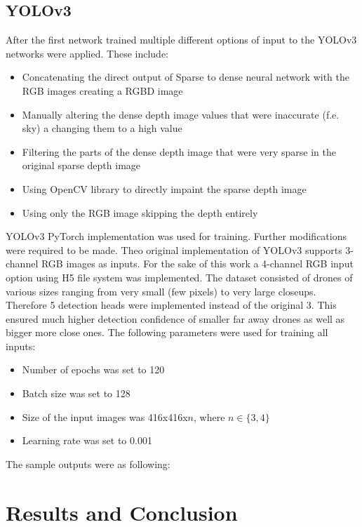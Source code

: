 \documentclass[twoside]{ctuthesis}
\theoremstyle{plain}
\theoremstyle{definition}
\theoremstyle{note}
\begin{document}
\section{YOLOv3}
After the first network trained multiple different options of input to the YOLOv3 networks were applied. These include:
\begin{itemize}
	\item Concatenating the direct output of Sparse to dense neural network with the RGB images creating a RGBD image
	\item Manually altering the dense depth image values that were inaccurate (f.e. sky) a changing them to a high value
	\item Filtering the parts of the dense depth image that were very sparse in the original sparse depth image
	\item Using OpenCV library to directly impaint the sparse depth image
	\item Using only the RGB image skipping the depth entirely
\end{itemize}
YOLOv3 PyTorch implementation was used for training. Further modifications were required to be made. Theo original implementation of YOLOv3 supports 3-channel RGB images as inputs. For the sake of this work a 4-channel RGB input option using H5 file system was implemented. The dataset consisted of drones of various sizes ranging from very small (few pixels) to very large closeups. Therefore 5 detection heads were implemented instead of the original 3. This ensured much higher detection confidence of smaller far away drones as well as bigger more close ones. The following parameters were used for training all inputs:
\begin{itemize}
	\item Number of epochs was set to 120
	\item Batch size was set to 128
	\item Size of the input images was 416x416x$n$, where $n\in\{3,4\}$
	\item Learning rate was set to 0.001
\end{itemize}
The sample outputs were as following:
\chapter{Results and Conclusion}
\end{document}
